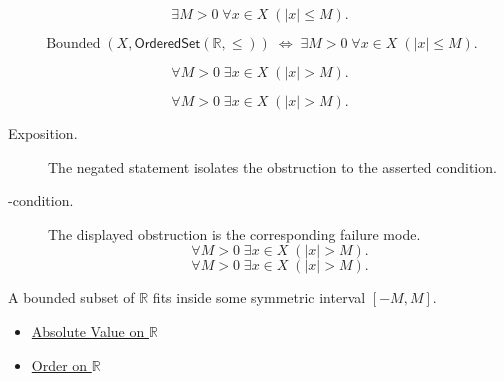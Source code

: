 \begin{remark*}
\[
  \exists M>0\;\forall x\in X\;(|x|\leq M).
\]
\end{remark*}

\begin{remark*}
\[
  \operatorname{Bounded}(X,\mathsf{OrderedSet}(\mathbb{R},\leq))
  \;\Longleftrightarrow\;
  \exists M>0\;\forall x\in X\;(|x|\leq M).
\]
\end{remark*}

\begin{remark*}
\[
  \forall M>0\;\exists x\in X\;(|x|>M).
\]
\end{remark*}

\begin{remark*}
\[
  \forall M>0\;\exists x\in X\;(|x|>M).
\]
\end{remark*}

\begin{remark*}
\begin{description}
  \item[Exposition.]
  The negated statement isolates the obstruction to the asserted condition.

  \item[\exists-condition.]
  The displayed obstruction is the corresponding failure mode.
  \[
  \forall M>0\;\exists x\in X\;(|x|>M).
\]
  \[
  \forall M>0\;\exists x\in X\;(|x|>M).
\]
\end{description}
\end{remark*}



\begin{remark*}[Interpretation]
A bounded subset of $\mathbb{R}$ fits inside some symmetric interval
$[-M,M]$.
\end{remark*}

\begin{dependencies}
\begin{itemize}
  \item \hyperref[def:real-chapter-absolute-value-on-r]{Absolute Value on $\mathbb{R}$}
  \item \hyperref[def:order-on-r]{Order on $\mathbb{R}$}
\end{itemize}
\end{dependencies}



